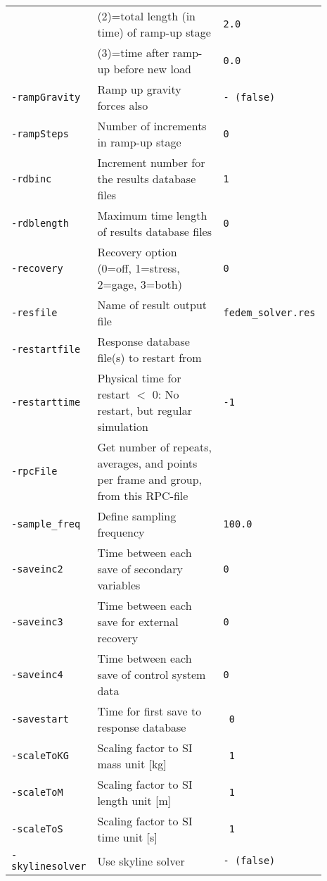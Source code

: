 {\begin{tabular}{|>{\raggedright} p{0.23\linewidth}| p{0.48\linewidth}| p{0.18\linewidth}|}
                      &      (2)=total length (in time) of ramp-up stage    &       \texttt{2.0} \\
                      &      (3)=time after ramp-up before new load        &        \texttt{0.0} \\
  \hline
  \texttt{-rampGravity}  &     Ramp up gravity forces also    &   \texttt{- (false)}  \\
  \hline
  \texttt{-rampSteps}  &     Number of increments in ramp-up stage   &  \texttt{0}  \\
  \hline
  \texttt{-rdbinc}  &     Increment number for the results database files   &   \texttt{1}  \\
  \hline
  \texttt{-rdblength}  &     Maximum time length of results database files   &  \texttt{0}  \\
  \hline
  \texttt{-recovery}  &     Recovery option (0=off, 1=stress, 2=gage, 3=both)   &  \texttt{0}  \\
  \hline
  \texttt{-resfile}  &     Name of result output file   &  \texttt{\scriptsize{fedem\_solver.res}}  \\
  \hline
  \texttt{-restartfile}  &     Response database file(s) to restart from   & \\
  \hline
  \texttt{-restarttime}  &     Physical time for restart\newline
                               $<$ 0: No restart, but regular simulation   &  \texttt{-1} \\
  \hline
  \texttt{-rpcFile}  &     Get number of repeats, averages, and
                           points per frame and group, from this RPC-file  &  \\
  \hline
  \texttt{-sample\_freq}  &     Define sampling frequency  & \texttt{100.0}  \\
  \hline
  \texttt{-saveinc2}  &     Time between each save of secondary variables  & \texttt{0}  \\
  \hline
  \texttt{-saveinc3}  &     Time between each save for external recovery  & \texttt{0}\tnote{1}  \\
  \hline
  \texttt{-saveinc4}  &     Time between each save of control system data & \texttt{0}  \\
  \hline
  \texttt{-savestart}  &     Time for first save to response database & \texttt{ 0}  \\
  \hline
  \texttt{-scaleToKG}  &     Scaling factor to SI mass unit [kg] & \texttt{ 1}  \\
  \hline
  \texttt{-scaleToM}  &     Scaling factor to SI length unit [m] & \texttt{ 1}  \\
  \hline
  \texttt{-scaleToS}  &     Scaling factor to SI time unit [s] & \texttt{ 1}  \\
  \hline
  \texttt{-skylinesolver}  &     Use skyline solver   & \texttt{- (false)}  \\
  \hline
\end{tabular}}

